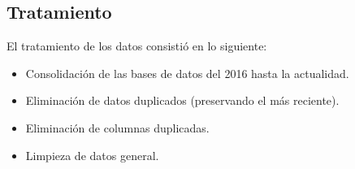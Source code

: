 \begin{itemize}
	\subsection{Tratamiento}
	El tratamiento de los datos consistió en lo siguiente:
	\begin{itemize}
		\item Consolidación de las bases de datos del 2016 hasta la actualidad. 
		\item Eliminación de datos duplicados (preservando el más reciente). 
		\item Eliminación de columnas duplicadas. 
		\item Limpieza de datos general. 
	\end{itemize}
	
\end{itemize}






